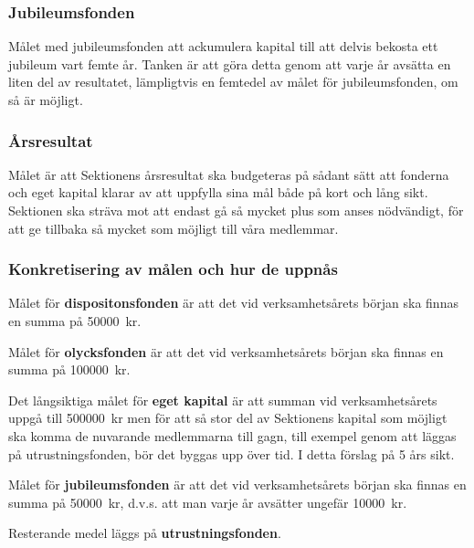 \documentclass[../_main/handlingar.tex]{subfiles}
\begin{document}
\subsubsection*{Jubileumsfonden}
Målet med jubileumsfonden att ackumulera kapital till att delvis bekosta ett jubileum vart femte år. Tanken är att göra detta genom att varje år avsätta en liten del av resultatet, lämpligtvis en femtedel av målet för jubileumsfonden, om så är möjligt.

\subsubsection*{Årsresultat}
Målet är att Sektionens årsresultat ska budgeteras på sådant sätt att fonderna och eget kapital klarar av att uppfylla sina mål både på kort och lång sikt. Sektionen ska sträva mot att endast gå så mycket plus som anses nödvändigt, för att ge tillbaka så mycket som möjligt till våra medlemmar.

\newpage
\subsubsection*{Konkretisering av målen och hur de uppnås}
Målet för \textbf{dispositonsfonden} är att det vid verksamhetsårets början ska finnas en summa på \SI{50000}{kr}.

Målet för \textbf{olycksfonden} är att det vid verksamhetsårets början ska finnas en summa på \SI{100000}{kr}.

Det långsiktiga målet för \textbf{eget kapital} är att summan vid verksamhetsårets uppgå till \SI{500000}{kr} men för att så stor del av Sektionens kapital som möjligt ska komma de nuvarande medlemmarna till gagn, till exempel genom att läggas på utrustningsfonden, bör det byggas upp över tid. I detta förslag på 5 års sikt.

Målet för \textbf{jubileumsfonden} är att det vid verksamhetsårets början ska finnas en summa på \SI{50000}{kr}, d.v.s. att man varje år avsätter ungefär \SI{10000}{kr}.

Resterande medel läggs på \textbf{utrustningsfonden}.
\end{document}

